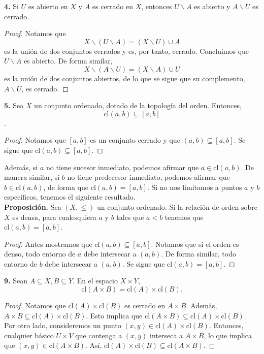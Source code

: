 \documentclass{article}
\begin{document}
\begin{mybox}
\textbf{4. } 	Si $U$ es abierto en $X$ y $A$ es cerrado en $X$, entonces $U \backslash A$ es abierto y $A \backslash U$ es cerrado.
\end{mybox}
\begin{proof}
	Notamos que 
	$$ X \backslash ( U \backslash  A) = (X \backslash U) \cup A $$
	es la unión de dos conjuntos cerrados y es, por tanto, cerrado. Concluimos que $U\backslash A$ es abierto.  De forma similar,
	$$X \backslash ( A \backslash  U) = (X \backslash A) \cup U $$
	es la unión de dos conjuntos abiertos, de lo que se sigue que su complemento, $A \backslash U$, es cerrado. 
\end{proof}	

\begin{mybox}
	\textbf{5. } Sea $X$ un conjunto ordenado, dotado de la topología del orden. Entonces, 
	$$ \text{cl}(a, b) \subseteq [a, b ] $$. 
\end{mybox}	
\begin{proof}
	Notamos que $[a, b]$ es un conjunto cerrado y que $(a, b) \subseteq [a, b]$. Se sigue que $\text{cl}(a, b) \subseteq [a, b]$.
\end{proof}

Además, si $a$ no tiene sucesor inmediato, podemos afirmar que $a \in \text{cl}(a, b)$. De manera similar, si $b$ no tiene predecesor inmediato, podemos afirmar que $b \in \text{cl}(a, b)$, de forma que $\text{cl}(a, b) = [a, b]$. Si no nos limitamos a puntos $a$ y $b$ específicos, tenemos el siguiente resultado. \\

\textbf{Proposición. } Sea $(X, \leq )$ un conjunto ordenado. Si la relación de orden sobre $X$ es densa, para cualesquiera $a$ y $b$ tales que $a < b$ tenemos que $\text{cl}(a, b) = [a, b]$.
\begin{proof}
	Antes mostramos que $\text{cl}(a, b) \subseteq [a, b]$. Notamos que si el orden es denso, todo entorno de $a$ debe intersecar a $(a, b)$. De forma similar, todo entorno de $b$ debe intersecar a $(a, b)$. Se sigue que $\text{cl}(a, b) = [a, b]$.
\end{proof}

\begin{mybox}
	\textbf{9. }Sean $A \subseteq X, B \subseteq Y$. En el espacio $X \times Y$,
	$$ \text{cl}(A \times B) = \text{cl}(A) \times \text{cl}(B) .$$
\end{mybox}	
\begin{proof}
	Notamos que $\text{cl}(A) \times \text{cl}(B)$ es cerrado en $A \times B$. Además, $A \times B \subseteq \text{cl}(A) \times \text{cl}(B)$. Esto implica que $\text{cl}(A \times B) \subseteq \text{cl}(A) \times \text{cl}(B)$.\\
	Por otro lado, consideremos un punto $(x, y) \in \text{cl}(A) \times \text{cl}(B)$. Entonces, cualquier básico $U \times V$ que contenga a $(x, y)$ interseca a $A \times B$, lo que implica que $(x, y) \in \text{cl}(A \times B)$. Así, $\text{cl}(A) \times \text{cl}(B) \subseteq \text{cl}(A \times B). $ 
\end{proof}
\end{document}
